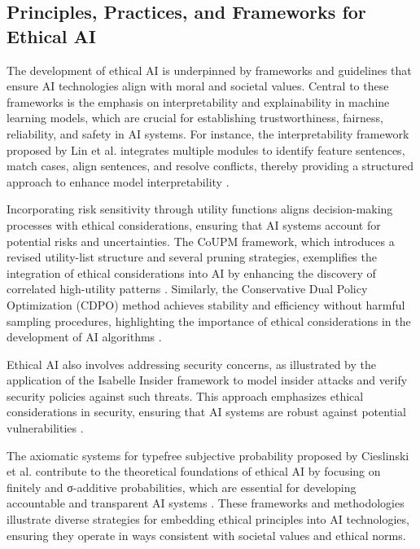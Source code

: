 \subsection{Principles, Practices, and Frameworks for Ethical AI} \label{subsec:Principles, Practices, and Frameworks for Ethical AI}

The development of ethical AI is underpinned by frameworks and guidelines that ensure AI technologies align with moral and societal values. Central to these frameworks is the emphasis on interpretability and explainability in machine learning models, which are crucial for establishing trustworthiness, fairness, reliability, and safety in AI systems. For instance, the interpretability framework proposed by Lin et al. integrates multiple modules to identify feature sentences, match cases, align sentences, and resolve conflicts, thereby providing a structured approach to enhance model interpretability \cite{lin2023interpretabilityframeworksimilarcase}.



Incorporating risk sensitivity through utility functions aligns decision-making processes with ethical considerations, ensuring that AI systems account for potential risks and uncertainties. The CoUPM framework, which introduces a revised utility-list structure and several pruning strategies, exemplifies the integration of ethical considerations into AI by enhancing the discovery of correlated high-utility patterns \cite{gan2019correlatedutilitybasedpatternmining}. Similarly, the Conservative Dual Policy Optimization (CDPO) method achieves stability and efficiency without harmful sampling procedures, highlighting the importance of ethical considerations in the development of AI algorithms \cite{zhang2022conservativedualpolicyoptimization}.



Ethical AI also involves addressing security concerns, as illustrated by the application of the Isabelle Insider framework to model insider attacks and verify security policies against such threats. This approach emphasizes ethical considerations in security, ensuring that AI systems are robust against potential vulnerabilities \cite{kammller2020applyingisabelleinsiderframework}.



The axiomatic systems for typefree subjective probability proposed by Cieslinski et al. contribute to the theoretical foundations of ethical AI by focusing on finitely and σ-additive probabilities, which are essential for developing accountable and transparent AI systems \cite{cieslinski2022axiomstypefreesubjectiveprobability}. These frameworks and methodologies illustrate diverse strategies for embedding ethical principles into AI technologies, ensuring they operate in ways consistent with societal values and ethical norms.






